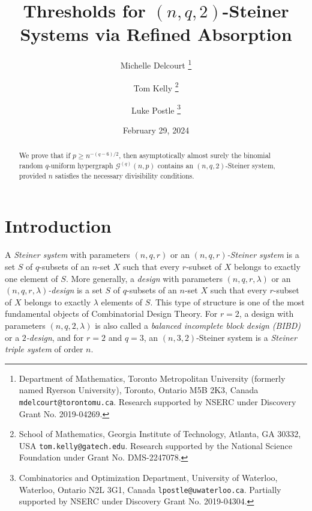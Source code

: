 \documentclass[11pt]{article}
\title{Thresholds for $(n,q,2)$-Steiner Systems via Refined Absorption}
\author{
Michelle Delcourt
\thanks{Department of Mathematics, Toronto Metropolitan University (formerly named Ryerson University),
Toronto, Ontario M5B 2K3, Canada {\tt mdelcourt@torontomu.ca}. Research supported by NSERC under Discovery Grant No. 2019-04269.}
\and
Tom Kelly
\thanks{School of Mathematics, Georgia Institute of Technology, Atlanta, GA 30332, USA {\tt tom.kelly@gatech.edu}.
Research supported by the National Science Foundation under Grant No. DMS-2247078.}
\and
Luke Postle
\thanks{Combinatorics and Optimization Department,
University of Waterloo, Waterloo, Ontario N2L 3G1, Canada {\tt lpostle@uwaterloo.ca}. Partially supported by NSERC
under Discovery Grant No. 2019-04304.}}
\date{February 29, 2024}
\numberwithin{equation}{section}
\newcounter{i}
\theoremstyle{plain}
\theoremstyle{plain} %
\theoremstyle{definition}
\begin{document}
\maketitle

\begin{abstract} 





We prove that if $p \geq n^{-(q-6)/2}$, then asymptotically almost surely the binomial random $q$-uniform hypergraph $\mathcal{G}^{(q)}(n,p)$ contains an $(n,q,2)$-Steiner system, provided $n$ satisfies the necessary divisibility conditions.
\end{abstract}

\section{Introduction}

A \textit{Steiner system} with parameters $(n,q,r)$ or an \textit{$(n,q,r)$-Steiner system} is a set $S$ of $q$-subsets of an $n$-set $X$ such that every $r$-subset of $X$ belongs to exactly one element of $S$.  More generally, a \textit{design} with parameters $(n,q,r,\lambda)$ or an \textit{$(n,q,r,\lambda)$-design} is a set $S$ of $q$-subsets of an $n$-set $X$ such that every $r$-subset of $X$ belongs to exactly $\lambda$ elements of $S$.  This type of structure is one of the most fundamental objects of Combinatorial Design Theory.  For $r = 2$, a design with parameters $(n,q,2,\lambda)$ is also called a \textit{balanced incomplete block design (BIBD)} or a \textit{$2$-design}, and for $r = 2$ and $q = 3$, an $(n,3,2)$-Steiner system is a \textit{Steiner triple system} of order $n$.
\end{document}
